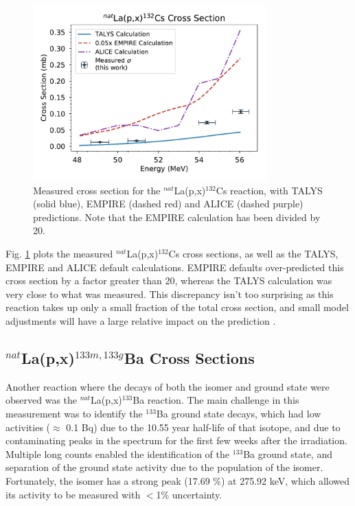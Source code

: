 \documentclass[aps,superscriptaddress,twocolumn,secnumarabic,balancelastpage,amsmath,amssymb,nofootinbib,floatfix]{revtex4-1}
\begin{document}
\begin{figure}[htb]
\includegraphics[width=9cm]{cross_sections/132CS}
\caption{Measured cross section for the $^{nat}$La(p,x)$^{132}$Cs reaction, with TALYS (solid blue), EMPIRE (dashed red) and ALICE (dashed purple) predictions.  Note that the EMPIRE calculation has been divided by 20.
}
\label{fig:132CS}
\end{figure}

Fig. \ref{fig:132CS} plots the measured $^{nat}$La(p,x)$^{132}$Cs cross sections, as well as the TALYS, EMPIRE and ALICE default calculations.  EMPIRE defaults over-predicted this cross section by a factor greater than 20, whereas the TALYS calculation was very close to what was measured.  This discrepancy isn't too surprising as this reaction takes up only a small fraction of the total cross section, and small model adjustments will have a large relative impact on the prediction \cite{KONING2003231}.

\subsection{$^{nat}$La(p,x)$^{133m,133g}$Ba Cross Sections}

Another reaction where the decays of both the isomer and ground state were observed was the $^{nat}$La(p,x)$^{133}$Ba reaction.  The main challenge in this measurement was to identify the $^{133}$Ba ground state decays, which had low activities ($\approx$ 0.1 Bq) due to the 10.55 year half-life of that isotope, and due to contaminating peaks in the spectrum for the first few weeks after the irradiation.  Multiple long counts enabled the identification of the $^{133}$Ba ground state, and separation of the ground state activity due to the population of the isomer.  Fortunately, the isomer has a strong peak (17.69 \%) at 275.92 keV, which allowed its activity to be measured with $<$1\% uncertainty.
\end{document}
